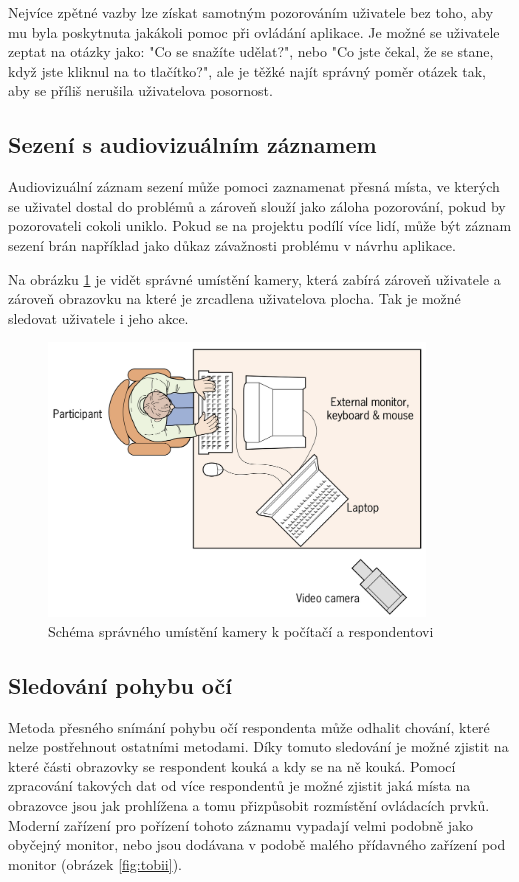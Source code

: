 Nejvíce zpětné vazby lze získat samotným pozorováním uživatele bez toho, aby mu byla poskytnuta jakákoli pomoc při ovládání aplikace. Je možné se uživatele zeptat na otázky jako: "Co se snažíte udělat?", nebo "Co jste čekal, že se stane, když jste kliknul na to tlačítko?", ale je těžké najít správný poměr otázek tak, aby se příliš nerušila uživatelova posornost\cite{stone2005user}.

\subsection{Sezení s audiovizuálním záznamem}
Audiovizuální záznam sezení může pomoci zaznamenat přesná místa, ve kterých se uživatel dostal do problémů a zároveň slouží jako záloha pozorování, pokud by pozorovateli cokoli uniklo. Pokud se na projektu podílí více lidí, může být záznam sezení brán například jako důkaz závažnosti problému v návrhu aplikace.\cite{stone2005user}

Na obrázku \ref{fig:testing-camera} je vidět správné umístění kamery, která zabírá zároveň uživatele a zároveň obrazovku na které je zrcadlena uživatelova plocha. Tak je možné sledovat uživatele i jeho akce.\cite{stone2005user}

\begin{figure}[htb]
\begin{center}
\includegraphics[width=100mm]{./pictures/testing-camera.png}
\caption{Schéma správného umístění kamery k počítačí a respondentovi\cite{stone2005user}}
\label{fig:testing-camera}
\end{center}
\end{figure}

\subsection{Sledování pohybu očí}
Metoda přesného snímání pohybu očí respondenta může odhalit chování, které nelze postřehnout ostatními metodami. Díky tomuto sledování je možné zjistit na které části obrazovky se respondent kouká a kdy se na ně kouká. Pomocí zpracování takových dat od více respondentů je možné zjistit jaká místa na obrazovce jsou jak prohlížena a tomu přizpůsobit rozmístění ovládacích prvků. Moderní zařízení pro pořízení tohoto záznamu vypadají velmi podobně jako obyčejný monitor, nebo jsou dodávana v podobě malého přídavného zařízení pod monitor (obrázek \ref{fig:tobii}).

